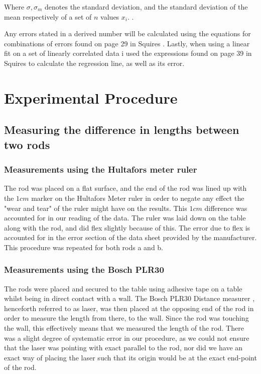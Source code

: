 \documentclass[11pt,a4paper]{article}
\begin{document}
    Where $\sigma, \sigma_m$ denotes the standard deviation, and the standard deviation of the mean respectively of a set of $n$ values $x_i$. \cite{squires}.

    Any errors stated in a derived number will be calculated using the equations for combinations of errors found on page 29 in Squires \cite{squires}. Lastly, when using a linear fit on a set of linearly correlated data i used the expressions found on page 39 in Squires \cite{squires} to calculate the regression line, as well as its error.

\section{\label{sec:exp_proced}Experimental Procedure}
 
  \subsection{Measuring the difference in lengths between two rods}
    \subsubsection{Measurements using the Hultafors meter ruler}
      The rod was placed on a flat surface, and the end of the rod was lined up with the $1cm$ marker on the Hultafors Meter ruler \cite{hultafors} in order to negate any effect the "wear and tear" of the ruler might have on the results. This $1cm$ difference was accounted for in our reading of the data. The ruler was laid down on the table along with the rod, and did flex slightly because of this. The error due to flex is accounted for in the error section of the data sheet provided by the manufacturer. This procedure was repeated for both rods a and b.

    \subsubsection{Measurements using the Bosch PLR30}
      The rods were placed and secured to the table using adhesive tape on a table whilst being in direct contact with a wall. The Bosch PLR30 Distance measurer \cite{PLR}, henceforth referred to as laser, was then placed at the opposing end of the rod in order to measure the length from there, to the wall. Since the rod was touching the wall, this effectively means that we measured the length of the rod. There was a slight degree of systematic error in our procedure, as we could not ensure that the laser was pointing with exact parallel to the rod, nor did we have an exact way of placing the laser such that its origin would be at the exact end-point of the rod. 
\end{document}

